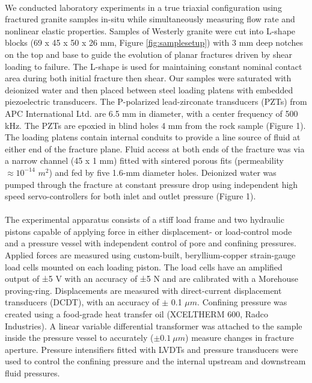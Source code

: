 \documentclass[letterpaper,10pt]{article}
\begin{document}
	\paragraph{} We conducted laboratory experiments in a true triaxial configuration using fractured granite samples in-situ while simultaneously measuring flow rate and nonlinear elastic properties. Samples of Westerly granite were cut  into L-shape blocks (69 x 45 x 50 x 26 mm, Figure \ref{fig:samplesetup}) with 3 mm deep notches on the top and base to guide the evolution of planar fractures driven by shear loading to failure. The L-shape is used for maintaining constant nominal contact area during both initial fracture then shear. Our samples were saturated with deionized water and then placed between steel loading platens  with  embedded piezoelectric transducers. The P-polarized lead-zirconate transducers (PZTs) from APC International Ltd. are 6.5 mm in diameter, with a center frequency of 500 kHz. The PZTs are epoxied in blind holes 4 mm from the rock sample (Figure 1). The loading platens contain internal conduits to provide a line source of fluid at either end of the fracture plane. Fluid access at both ends of the fracture was via a narrow channel (45 x 1 mm) fitted with sintered porous fits (permeability $\approx 10^{-14}$ $m^2$) and fed by five 1.6-mm diameter holes.  Deionized water was pumped through the fracture at constant pressure drop using independent high speed servo-controllers for both inlet and outlet pressure (Figure 1).
	
	\paragraph{} The experimental apparatus consists of a stiff load frame and two hydraulic pistons capable of applying force in either displacement- or load-control mode and a pressure vessel with independent control of pore and confining pressures. Applied forces are measured using custom-built, beryllium-copper strain-gauge load cells mounted on each loading piston. The load cells have an amplified output of ±5 V with an accuracy of ±5 N and are calibrated with a Morehouse proving-ring. Displacements are measured with direct-current displacement transducers (DCDT), with an accuracy of $\pm$ 0.1 $\mu m$. Confining pressure was created using a food-grade heat transfer oil (XCELTHERM 600, Radco Industries). A linear variable differential transformer was attached to the sample inside the pressure vessel to accurately ($\pm 0.1\ \mu m$) measure changes in fracture aperture. Pressure intensifiers fitted with LVDTs and pressure transducers were used to control the confining pressure and the internal upstream and downstream fluid pressures.
	
\end{document}
